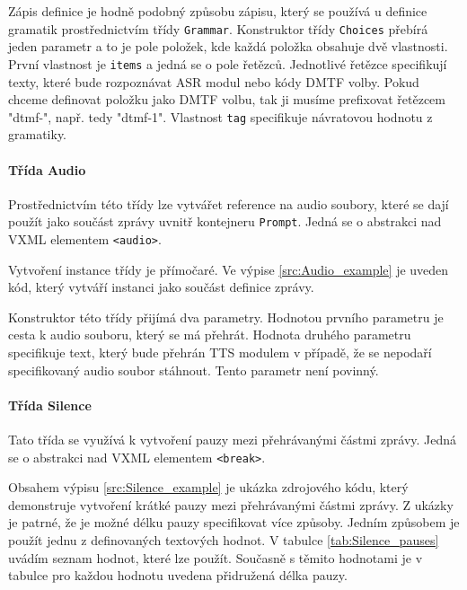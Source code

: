 \documentclass[ing,male,java,dept460,twoside]{diploma}						%
\begin{document}


Zápis definice je hodně podobný způsobu zápisu, který se používá u definice gramatik prostřednictvím třídy \texttt{Grammar}. Konstruktor třídy \texttt{Choices} přebírá jeden parametr a to je pole položek, kde každá položka obsahuje dvě vlastnosti. První vlastnost je \texttt{items} a jedná se o pole řetězců. Jednotlivé řetězce specifikují texty, které bude rozpoznávat ASR modul nebo kódy DMTF volby. Pokud chceme definovat položku jako DMTF volbu, tak ji musíme prefixovat řetězcem "dtmf-", např. tedy "dtmf-1". Vlastnost \texttt{tag} specifikuje návratovou hodnotu z gramatiky.

\paragraph{Třída Audio}
\label{sec:Audio}
Prostřednictvím této třídy lze vytvářet reference na audio soubory, které se dají použít jako součást zprávy uvnitř kontejneru \texttt{Prompt}. Jedná se o abstrakci nad VXML elementem \texttt{<audio>}.

Vytvoření instance třídy je přímočaré. Ve výpise \ref{src:Audio_example} je uveden kód, který vytváří instanci jako součást definice zprávy.



Konstruktor této třídy přijímá dva parametry. Hodnotou prvního parametru je cesta k audio souboru, který se má přehrát. Hodnota druhého parametru specifikuje text, který bude přehrán TTS modulem v případě, že se nepodaří specifikovaný audio soubor stáhnout. Tento parametr není povinný.

\paragraph{Třída Silence}
\label{sec:Silence}
Tato třída se využívá k vytvoření pauzy mezi přehrávanými částmi zprávy. Jedná se o abstrakci nad VXML elementem \texttt{<break>}.

Obsahem výpisu \ref{src:Silence_example} je ukázka zdrojového kódu, který demonstruje vytvoření krátké pauzy mezi přehrávanými částmi zprávy. Z ukázky je patrné, že je možné délku pauzy specifikovat více způsoby. Jedním způsobem je použít jednu z definovaných textových hodnot. V tabulce \ref{tab:Silence_pauses} uvádím seznam hodnot, které lze použít. Současně s těmito hodnotami je v tabulce pro každou hodnotu uvedena přidružená délka pauzy\cite{vxml_org}.
\end{document}
